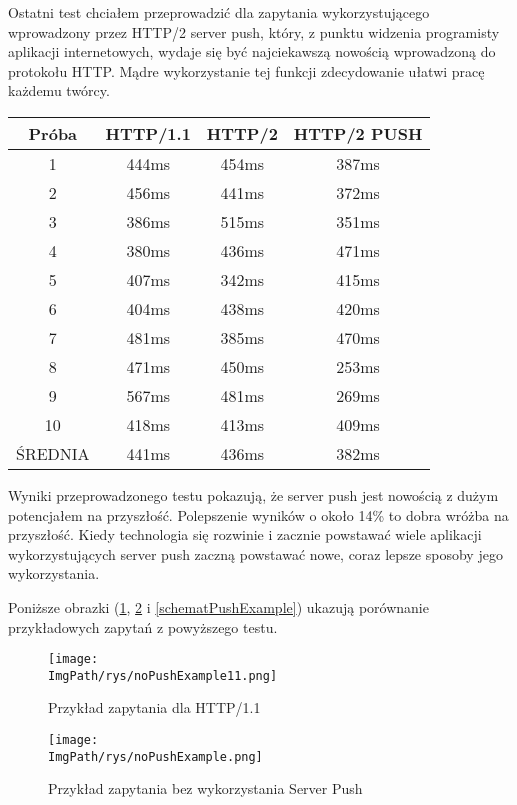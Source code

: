 \documentclass[a4paper,12pt,twoside,openany]{report}
\newcommand{\ImgPath}{.}
\begin{document}
Ostatni test chciałem przeprowadzić dla zapytania wykorzystującego wprowadzony przez HTTP/2 server push, który, z punktu widzenia programisty aplikacji internetowych, wydaje się być najciekawszą nowością wprowadzoną do protokołu HTTP.
Mądre wykorzystanie tej funkcji zdecydowanie ułatwi pracę każdemu twórcy.

\begin{tabular}{c|c|c|c}
Próba & HTTP/1.1 & HTTP/2 & HTTP/2 PUSH \\ \hline
1 & 444ms & 454ms & 387ms \\
2 & 456ms & 441ms & 372ms \\
3 & 386ms & 515ms & 351ms \\
4 & 380ms & 436ms & 471ms \\
5 & 407ms & 342ms & 415ms \\
6 & 404ms & 438ms & 420ms \\
7 & 481ms & 385ms & 470ms \\
8 & 471ms & 450ms & 253ms \\
9 & 567ms & 481ms & 269ms \\
10 & 418ms & 413ms & 409ms \\ \hline
ŚREDNIA & 441ms & 436ms & 382ms \\
\end{tabular}

Wyniki przeprowadzonego testu pokazują, że server push jest nowością z dużym potencjałem na przyszłość.
Polepszenie wyników o około 14\% to dobra wróżba na przyszłość.
Kiedy technologia się rozwinie i zacznie powstawać wiele aplikacji wykorzystujących server push zaczną powstawać nowe, coraz lepsze sposoby jego wykorzystania.

Poniższe obrazki (\ref{schematNoPushExample11}, \ref{schematNoPushExample} i \ref{schematPushExample}) ukazują porównanie przykładowych zapytań z powyższego testu.

\begin{figure}[!htbp]
	\begin{center}
\centering
\texttt{[image: \\ImgPath/rys/noPushExample11.png]}
\end{center}
	\caption{Przykład zapytania dla HTTP/1.1}
	\label{schematNoPushExample11}
\end{figure}

\begin{figure}[!htbp]
	\begin{center}
\centering
\texttt{[image: \\ImgPath/rys/noPushExample.png]}
\end{center}
	\caption{Przykład zapytania bez wykorzystania Server Push}
	\label{schematNoPushExample}
\end{figure}
\end{document}
